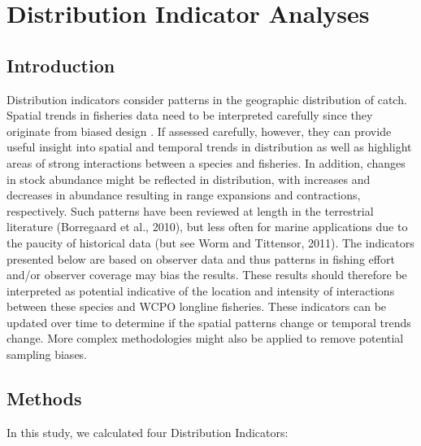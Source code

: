 \documentclass[12pt]{SCreport}
\begin{document}
             
        
\section{Distribution Indicator Analyses}
      \subsection{Introduction}

      Distribution indicators consider patterns in the geographic distribution of catch. Spatial trends in fisheries data need to be interpreted carefully since they originate from biased design \citep{Walters2003_a}. If assessed carefully, however, they can provide useful insight into spatial and temporal trends in distribution as well as highlight areas of strong interactions between a species and fisheries. In addition, changes in stock abundance might be reflected in distribution\citep{MacCall1990}, with increases and decreases in abundance resulting in range expansions and contractions, respectively. Such patterns have been reviewed at length in the terrestrial literature (Borregaard et al., 2010), but less often for marine applications due to the paucity of historical data (but see Worm and Tittensor, 2011). The indicators presented below are based on observer data and thus patterns in fishing effort and/or observer coverage may bias the results.  These results should therefore be interpreted as potential indicative of the location and intensity of interactions between these species and WCPO longline fisheries.  These indicators can be updated over time to determine if the spatial patterns change or temporal trends change.  More complex methodologies might also be applied to remove potential sampling biases.
            
      \subsection{Methods}
      In this study, we calculated four Distribution Indicators:
      
\end{document}
